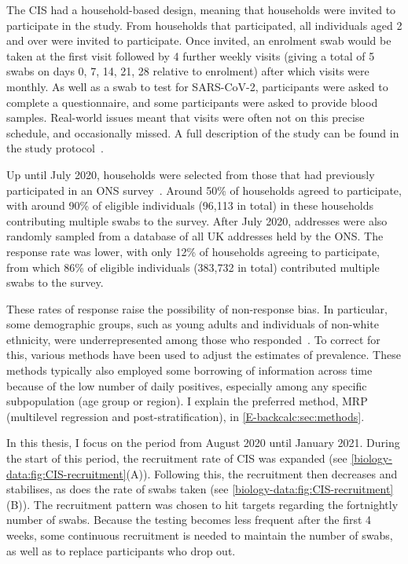 \documentclass[thesis.tex]{subfiles}
\begin{document}
The CIS had a household-based design, meaning that households were invited to participate in the study.
From households that participated, all individuals aged 2 and over were invited to participate.
Once invited, an enrolment swab would be taken at the first visit followed by 4 further weekly visits (giving a total of 5 swabs on days 0, 7, 14, 21, 28 relative to enrolment) after which visits were monthly.
As well as a swab to test for SARS-CoV-2, participants were asked to complete a questionnaire, and some participants were asked to provide blood samples.
Real-world issues meant that visits were often not on this precise schedule, and occasionally missed.
A full description of the study can be found in the study protocol~\autocite{cisProtocol}.

Up until July 2020, households were selected from those that had previously participated in an ONS survey~\autocite{CIStechData}.
Around 50\% of households agreed to participate, with around 90\% of eligible individuals (96,113 in total) in these households contributing multiple swabs to the survey.
After July 2020, addresses were also randomly sampled from a database of all UK addresses held by the ONS.
The response rate was lower, with only 12\% of households agreeing to participate, from which 86\% of eligible individuals (383,732 in total) contributed multiple swabs to the survey.

These rates of response raise the possibility of non-response bias.
In particular, some demographic groups, such as young adults and individuals of non-white ethnicity, were underrepresented among those who responded~\autocite{pouwelsCommunity}.
To correct for this, various methods have been used to adjust the estimates of prevalence.
These methods typically also employed some borrowing of information across time because of the low number of daily positives, especially among any specific subpopulation (\eg age group or region).
I explain the preferred method, MRP (multilevel regression and post-stratification), in \cref{E-backcalc:sec:methods}.

In this thesis, I focus on the period from August 2020 until January 2021.
During the start of this period, the recruitment rate of CIS was expanded (see \cref{biology-data:fig:CIS-recruitment}(A)).
Following this, the recruitment then decreases and stabilises, as does the rate of swabs taken (see \cref{biology-data:fig:CIS-recruitment}(B)).
The recruitment pattern was chosen to hit targets regarding the fortnightly number of swabs.
Because the testing becomes less frequent after the first 4 weeks, some continuous recruitment is needed to maintain the number of swabs, as well as to replace participants who drop out.
\end{document}

